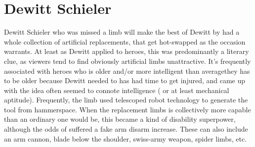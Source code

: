 \documentclass[12pt]{book}
\begin{document}
\chapter{Dewitt Schieler}

Dewitt Schieler who was missed a limb will make the best of Dewitt by had a whole collection of artificial replacements, that get hot-swapped as the occasion warrants. At least as Dewitt applied to heroes, this was predominantly a literary clue, as viewers tend to find obviously artificial limbs unattractive. It's frequently associated with heroes who is older and/or more intelligent than averagethey has to be older because Dewitt needed to has had time to get injured, and came up with the idea often seemed to connote intelligence ( or at least mechanical aptitude). Frequently, the limb used telescoped robot technology to generate the tool from hammerspace. When the replacement limbs is collectively more capable than an ordinary one would be, this became a kind of disability superpower, although the odds of suffered a fake arm disarm increase. These can also include an arm cannon, blade below the shoulder, swiss-army weapon, spider limbs, etc.
\end{document}
